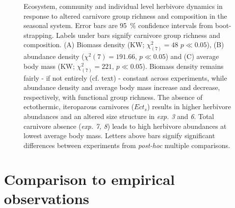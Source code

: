 \begin{figure}[htb!]
\centering

\caption[Ecosystem, community and individual level response to altered carnivore group richness and composition in the seasonal system]{Ecosystem, community and individual level herbivore dynamics in response to altered carnivore group richness and composition in the seasonal system. Error bars are 95~\% confidence intervals from boot-strapping. Labels under bars signify carnivore group richness and composition. (A) Biomass density (KW; $\chi^{2}_{(7)} = 48$ $p \ll 0.05$), (B) abundance density ($\chi^{2}(7) = 191.66$, $p \ll 0.05$) and (C) average body mass (KW; $\chi^{2}_{(7)} = 221$, $p \ll 0.05$). Biomass density remains fairly - if not entirely (cf. text) - constant across experiments, while abundance density and average body mass increase and decrease, respectively, with functional group richness. The absence of ectothermic, iteroparous carnivores ($Ect_s$) results in higher herbivore abundances and an altered size structure in \textit{exp. 3} and \textit{6}. Total carnivore absence (\textit{exp. 7, 8}) leads to high herbivore abundances at lowest average body mass. Letters above bars signify significant differences between experiments from \textit{post-hoc} multiple comparisons.}
\label{fig:chap:res:dyn:cell1}
\end{figure}

\clearpage


%
\section{Comparison to empirical observations}

